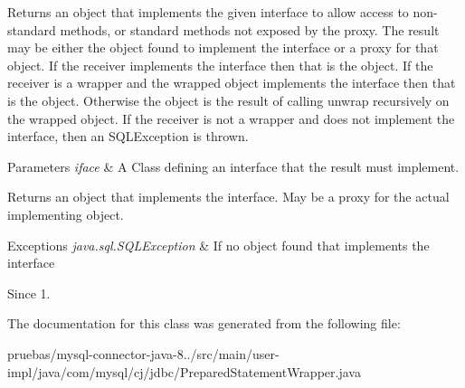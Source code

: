 Returns an object that implements the given interface to allow access to non-\/standard methods, or standard methods not exposed by the proxy. The result may be either the object found to implement the interface or a proxy for that object. If the receiver implements the interface then that is the object. If the receiver is a wrapper and the wrapped object implements the interface then that is the object. Otherwise the object is the result of calling {\ttfamily unwrap} recursively on the wrapped object. If the receiver is not a wrapper and does not implement the interface, then an {\ttfamily S\+Q\+L\+Exception} is thrown.


\begin{DoxyParams}{Parameters}
{\em iface} & A Class defining an interface that the result must implement. \\
\hline
\end{DoxyParams}
\begin{DoxyReturn}{Returns}
an object that implements the interface. May be a proxy for the actual implementing object. 
\end{DoxyReturn}

\begin{DoxyExceptions}{Exceptions}
{\em java.\+sql.\+S\+Q\+L\+Exception} & If no object found that implements the interface \\
\hline
\end{DoxyExceptions}
\begin{DoxySince}{Since}
1. 
\end{DoxySince}


The documentation for this class was generated from the following file\+:\begin{DoxyCompactItemize}
\item 
pruebas/mysql-\/connector-\/java-\/8../src/main/user-\/impl/java/com/mysql/cj/jdbc/Prepared\+Statement\+Wrapper.\+java\end{DoxyCompactItemize}
